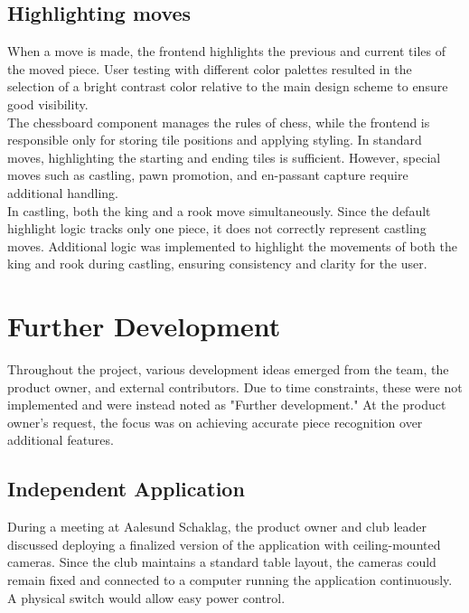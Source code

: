 \subsection{Highlighting moves}
When a move is made, the frontend highlights the previous and current tiles of the moved piece. User testing with different color palettes resulted in the selection of a bright contrast color relative to the main design scheme to ensure good visibility. \\

The chessboard component manages the rules of chess, while the frontend is responsible only for storing tile positions and applying styling. In standard moves, highlighting the starting and ending tiles is sufficient. However, special moves such as \gls{castling}, pawn \gls{promotion}, and \gls{en-passant} capture require additional handling. \\

In \gls{castling}, both the king and a rook move simultaneously. Since the default highlight logic tracks only one piece, it does not correctly represent \gls{castling} moves. Additional logic was implemented to highlight the movements of both the king and rook during \gls{castling}, ensuring consistency and clarity for the user.







\section{Further Development}
Throughout the project, various development ideas emerged from the team, the product owner, and external contributors. Due to time constraints, these were not implemented and were instead noted as "Further development." At the product owner's request, the focus was on achieving accurate piece recognition over additional features.

\subsection{Independent Application}
During a meeting at Aalesund Schaklag, the product owner and club leader discussed deploying a finalized version of the application with ceiling-mounted cameras. Since the club maintains a standard table layout, the cameras could remain fixed and connected to a computer running the application continuously. A physical switch would allow easy power control. \\

